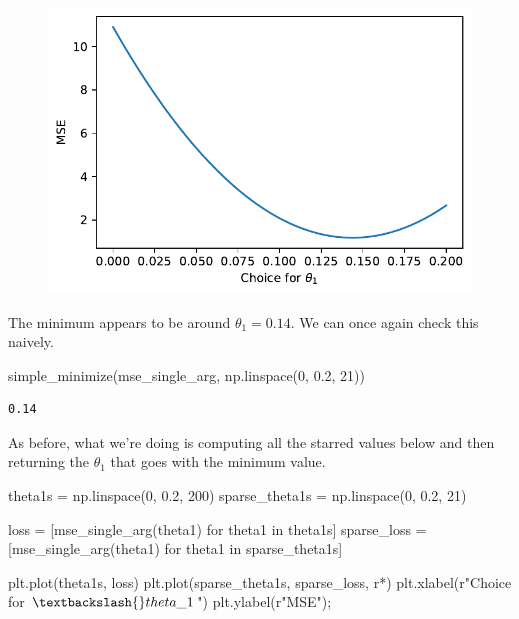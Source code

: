 \documentclass[
  letterpaper,
  DIV=11,
  numbers=noendperiod]{scrreprt}
\newenvironment{Shaded}{\begin{snugshade}}{\end{snugshade}}
\newcommand{\ControlFlowTok}[1]{\textcolor[rgb]{0.00,0.23,0.31}{#1}}
\newcommand{\DecValTok}[1]{\textcolor[rgb]{0.68,0.00,0.00}{#1}}
\newcommand{\FloatTok}[1]{\textcolor[rgb]{0.68,0.00,0.00}{#1}}
\newcommand{\KeywordTok}[1]{\textcolor[rgb]{0.00,0.23,0.31}{#1}}
\newcommand{\NormalTok}[1]{\textcolor[rgb]{0.00,0.23,0.31}{#1}}
\newcommand{\OperatorTok}[1]{\textcolor[rgb]{0.37,0.37,0.37}{#1}}
\newcommand{\StringTok}[1]{\textcolor[rgb]{0.13,0.47,0.30}{#1}}
\newcommand{\VerbatimStringTok}[1]{\textcolor[rgb]{0.13,0.47,0.30}{#1}}
\begin{document}
\begin{figure}[H]

{\centering \includegraphics{gradient_descent/gradient_descent_files/figure-pdf/cell-27-output-1.pdf}

}

\end{figure}

The minimum appears to be around \(\theta_1 = 0.14\). We can once again
check this naively.

\begin{Shaded}
\begin{Highlighting}[]
\NormalTok{simple\_minimize(mse\_single\_arg, np.linspace(}\DecValTok{0}\NormalTok{, }\FloatTok{0.2}\NormalTok{, }\DecValTok{21}\NormalTok{))}
\end{Highlighting}
\end{Shaded}

\begin{verbatim}
0.14
\end{verbatim}

As before, what we're doing is computing all the starred values below
and then returning the \(\theta_1\) that goes with the minimum value.

\begin{Shaded}
\begin{Highlighting}[]
\NormalTok{theta1s }\OperatorTok{=}\NormalTok{ np.linspace(}\DecValTok{0}\NormalTok{, }\FloatTok{0.2}\NormalTok{, }\DecValTok{200}\NormalTok{)}
\NormalTok{sparse\_theta1s }\OperatorTok{=}\NormalTok{ np.linspace(}\DecValTok{0}\NormalTok{, }\FloatTok{0.2}\NormalTok{, }\DecValTok{21}\NormalTok{)}

\NormalTok{loss }\OperatorTok{=}\NormalTok{ [mse\_single\_arg(theta1) }\ControlFlowTok{for}\NormalTok{ theta1 }\KeywordTok{in}\NormalTok{ theta1s]}
\NormalTok{sparse\_loss }\OperatorTok{=}\NormalTok{ [mse\_single\_arg(theta1) }\ControlFlowTok{for}\NormalTok{ theta1 }\KeywordTok{in}\NormalTok{ sparse\_theta1s]}

\NormalTok{plt.plot(theta1s, loss)}
\NormalTok{plt.plot(sparse\_theta1s, sparse\_loss, }\StringTok{\textquotesingle{}r*\textquotesingle{}}\NormalTok{)}
\NormalTok{plt.xlabel(}\VerbatimStringTok{r"Choice for $\textbackslash{}theta\_1$"}\NormalTok{)}
\NormalTok{plt.ylabel(}\VerbatimStringTok{r"MSE"}\NormalTok{)}\OperatorTok{;}
\end{Highlighting}
\end{Shaded}
\end{document}
